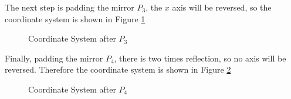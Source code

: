 \documentclass{article}
\begin{document}
The next step is padding the mirror $P_3$, the $x$ axis will be reversed, so the coordinate system is shown in Figure \ref{fig:3-17-5}

\begin{figure}[H]
    \centering
    \caption{Coordinate System after $P_3$}
    \label{fig:3-17-5}
\end{figure}

Finally, padding the mirror $P_4$, there is two times reflection, so no axis will be reversed. Therefore the coordinate system is shown in Figure \ref{fig:3-17-6}

\begin{figure}[H]
    \centering
    \caption{Coordinate System after $P_4$}
    \label{fig:3-17-6}
\end{figure}
\end{document}
